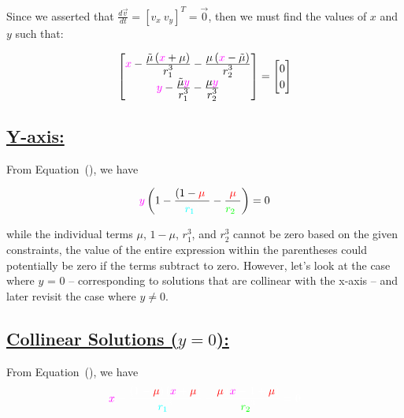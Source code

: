 \documentclass{article}
\newcommand{\cw}{\color{white}}
\newcommand{\cm}{\color{magenta}}
\newcommand{\cc}{\color{cyan}}
\newcommand{\cred}{\color{red}}
\newcommand{\cg}{\color{green}}
\newcommand{\deriv}[2]{\frac{d#1}{d#2}}
\newcommand{\ddfrac}[2]{\frac{\displaystyle #1}{\displaystyle #2}}
\begin{document}
Since we asserted that $\displaystyle \deriv{\vec{v}}{t} = \left[v_x \ v_y\right]^T = \vec{0}$, then we must find the values of $x$ and $y$ such that:

\begin{equation}
    \begin{bmatrix}
        \textcolor{magenta}{x} - \ddfrac{\tilde{\mu} \left(\textcolor{magenta}{x}+\mu\right)}{r_1^3} - \ddfrac{\mu \left(\textcolor{magenta}{x}-\tilde{\mu}\right)}{r_2^3} \\[0.2cm]
        \textcolor{magenta}{y} - \ddfrac{\tilde{\mu}\textcolor{magenta}{y}}{r_1^3} - \ddfrac{\mu \textcolor{magenta}{y}}{r_2^3}
    \end{bmatrix}
    =
    {
    \renewcommand{\arraystretch}{1.2} %
    \begin{bmatrix}
        0 \\
        0
    \end{bmatrix}
    }
    \label{eq:roots}
\end{equation}

\subsection*{\underline{Y-axis:}}

From Equation~(), we have

\begin{equation}
    \textcolor{magenta}{y} \left( 1 - \ddfrac{\left(1-\cred\mu\cw\right)}{\cc r_1 \cw ^3} - \ddfrac{\cred\mu\cw}{\cg r_2 \cw ^3} \right) = 0
    \label{eq:rootsY}
\end{equation}

while the individual terms $\mu$, $1-\mu$, $r_1^3$, and $r_2^3$ cannot be zero based on the given constraints, the value of the entire expression within the parentheses could potentially be zero if the terms subtract to zero. However, let's look at the case where $y$ = 0 -- corresponding to solutions that are collinear with the x-axis -- and later revisit the case where $y \neq 0$.

\pagebreak

\subsection*{\underline{Collinear Solutions ($y = 0$):}}

From Equation~(), we have
\begin{equation}
    \cm x \cw - \ddfrac{\left(1 - \cred \mu \cw \right) \left(\cm x \cw + \cred \mu \cw\right)}{\cc r_1 \cw ^3} - \ddfrac{\cred \mu \cw \left(\cm x \cw - 1 + \cred\mu\cw\right)}{\cg r_2 \cw ^3} = 0
    \label{eq:rootsX}
\end{equation}
\end{document}
